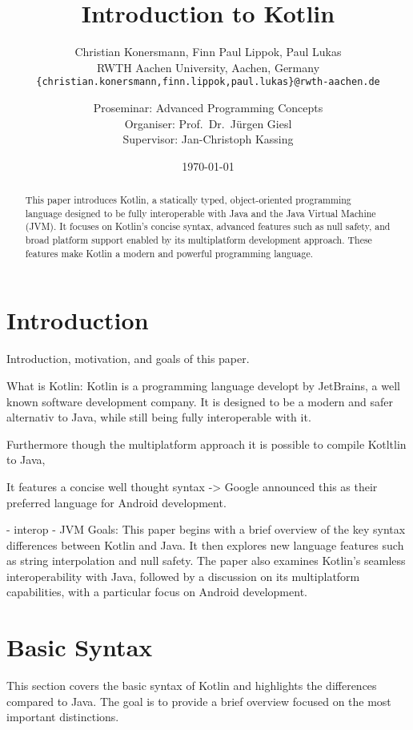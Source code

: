 \documentclass[a4paper, 11pt]{article}
\title{\huge \bfseries Introduction to Kotlin}
\author{
  Christian Konersmann, Finn Paul Lippok, Paul Lukas \\[1ex]
  RWTH Aachen University, Aachen, Germany \\
  \texttt{\{christian.konersmann,finn.lippok,paul.lukas\}@rwth-aachen.de} \\
  \and
  Proseminar: Advanced Programming Concepts \\
  Organiser: Prof.\ Dr.\ Jürgen Giesl \\
  Supervisor: Jan-Christoph Kassing
}
\date{\today}
\begin{document}
\maketitle

\begin{abstract}
This paper introduces Kotlin, a statically typed, object-oriented programming language designed to be fully interoperable with Java and the Java Virtual Machine (JVM). It focuses on Kotlin's concise syntax, advanced features such as null safety, and broad platform support enabled by its multiplatform development approach. These features make Kotlin a modern and powerful programming language. %

\end{abstract}

\section{Introduction}
  Introduction, motivation, and goals of this paper.


  What is Kotlin:
  Kotlin is a programming language developt by JetBrains, a well known software development company. It is designed to be a modern and safer alternativ to Java, while still being fully interoperable with it.

  Furthermore though the multiplatform approach it is possible to compile Kotltlin to Java, 

  It features a concise well thought syntax -> Google announced this as their preferred language for Android development.

  - interop
  - JVM
  Goals:
  This paper begins with a brief overview of the key syntax differences between Kotlin and Java. It then explores new language features such as string interpolation and null safety. The paper also examines Kotlin's seamless interoperability with Java, followed by a discussion on its multiplatform capabilities, with a particular focus on Android development.


\section{Basic Syntax}
This section covers the basic syntax of Kotlin and highlights the differences compared to Java.
The goal is to provide a brief overview focused on the most important distinctions.
\end{document}

